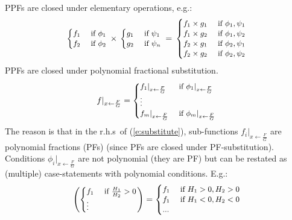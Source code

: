 \documentclass[]{article}
\newcommand{\case}[2]{#2 &\text{ if } #1}%
\begin{document}
PPFs are closed under elementary operations, e.g.:
\begin{equation*}
\footnotesize
  \begin{cases}
  \case{\phi_1}{f_1}\\
  \case{\phi_2}{f_2}    
  \end{cases}
\,
 \times
\,
  \begin{cases}
  \case{\psi_1}{g_1} \\
  \case{\psi_n}{g_2} 
  \end{cases}
 \, = \,
\begin{cases}
  \case{\phi_1, \psi_1}{f_1 \times g_1} \\ 
  \case{\phi_1, \psi_2}{f_1 \times g_2} \\
  \case{\phi_2, \psi_1}{f_2 \times g_1} \\
  \case{\phi_2, \psi_2}{f_2 \times g_2}
  \end{cases}
\end{equation*} 
%
PPFs are closed under polynomial fractional substitution.%
\begin{equation}
\label{e:substitute}
\footnotesize
f|_{x \leftarrow \frac{F}{G}}
=
\begin{cases}
  \case{{\phi_1}|_{x \leftarrow \frac{F}{G}}}{{f_1}|_{x \leftarrow \frac{F}{G}}}\\
\vdots\\
  \case{{\phi_m}|_{x \leftarrow \frac{F}{G}}}{{f_m}|_{x \leftarrow \frac{F}{G}}}    
  \end{cases}
\end{equation}
The reason is that in the r.h.s\ of (\ref{e:substitute}), 
sub-functions $f_i |_{x \leftarrow \frac{F}{G}}$ are polynomial fractions (PFs) 
(since PFs are closed under PF-substitution).
Conditions ${\phi_i}|_{x \leftarrow \frac{F}{G}}$ are not polynomial (they are PF) %
but can be restated as (multiple) case-statements with polynomial conditions. E.g.:
\begin{equation*} \footnotesize
\left(
 \begin{cases}
  \case{\frac{H_1}{H_2} > 0}{f_1} \\
   \vdots
 \end{cases} 
\right)
 =
{\footnotesize
\begin{cases}
  \case{H_1 > 0, H_2 > 0 }{f_1} \\ 
  \case{H_1 < 0, H_2 < 0}{f_1} \\ 
  ...
 \end{cases} 
}
\end{equation*}
\end{document}
